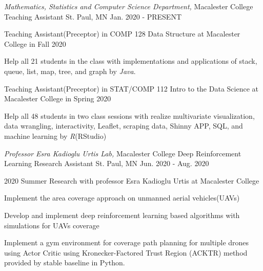 

\begin{cventries}

  \cventry
    {\textit{Mathematics, Statistics and Computer Science Department,} Macalester College} %
    {Teaching Assistant} %
    {St. Paul, MN} %
    {Jan. 2020 - PRESENT} %
    {
      \begin{cvitems} %
        \item {Teaching Assistant(Preceptor) in COMP 128 Data Structure at Macalester College in Fall 2020}
        \item {Help all 21 students in the class with implementations and applications of stack, queue, list, map, tree, and graph by \textit{Java}}.
        \item {Teaching Assistant(Preceptor) in STAT/COMP 112 Intro to the Data Science at Macalester College in  Spring 2020}
        \item {Help all 48 students in two class sessions with realize multivariate visualization, data wrangling, interactivity, Leaflet, scraping data, Shinny APP, SQL, and machine learning by  \textit{R}(RStudio)}
      \end{cvitems}
    }


\cventry
    {\textit{Professor Esra Kadioglu Urtis Lab,} Macalester College} 
    {Deep Reinforcement Learning Research Assistant} 
    {St. Paul, MN} %
    {Jun. 2020 - Aug. 2020} %
    {
      \begin{cvitems} %
        \item {2020 Summer Research with professor Esra Kadioglu Urtis at Macalester College}
        \item {Implement the area coverage approach on unmanned aerial vehicles(UAVs)}
        \item {Develop and implement deep reinforcement learning based algorithms with simulations for UAVs coverage}
        \item {Implement a gym environment for coverage path planning for multiple drones using Actor Critic using Kronecker-Factored Trust Region (ACKTR) method provided by stable baseline in Python. }
      \end{cvitems}
    }
    

\end{cventries}
